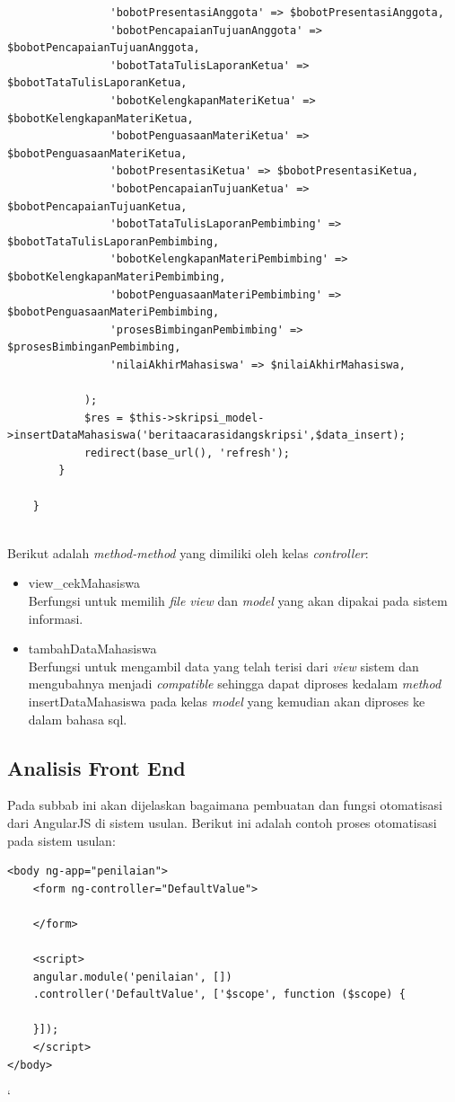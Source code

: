 \begin{lstlisting}
				'bobotPresentasiAnggota' => $bobotPresentasiAnggota,
				'bobotPencapaianTujuanAnggota' => $bobotPencapaianTujuanAnggota,
				'bobotTataTulisLaporanKetua' => $bobotTataTulisLaporanKetua,
				'bobotKelengkapanMateriKetua' => $bobotKelengkapanMateriKetua,
				'bobotPenguasaanMateriKetua' => $bobotPenguasaanMateriKetua,
				'bobotPresentasiKetua' => $bobotPresentasiKetua,
				'bobotPencapaianTujuanKetua' => $bobotPencapaianTujuanKetua,
				'bobotTataTulisLaporanPembimbing' => $bobotTataTulisLaporanPembimbing,
				'bobotKelengkapanMateriPembimbing' => $bobotKelengkapanMateriPembimbing,
				'bobotPenguasaanMateriPembimbing' => $bobotPenguasaanMateriPembimbing,
				'prosesBimbinganPembimbing' => $prosesBimbinganPembimbing,
				'nilaiAkhirMahasiswa' => $nilaiAkhirMahasiswa,
			
			);
			$res = $this->skripsi_model->insertDataMahasiswa('beritaacarasidangskripsi',$data_insert);
			redirect(base_url(), 'refresh');
		}
	
	}
	
\end{lstlisting}

Berikut adalah \textit{method-method} yang dimiliki oleh kelas \textit{controller}:
\begin{itemize}
	\item view\_cekMahasiswa\\
	Berfungsi untuk memilih \textit{file view} dan \textit{model} yang akan dipakai pada sistem informasi.
	\item tambahDataMahasiswa\\
	Berfungsi untuk mengambil data yang telah terisi dari \textit{view} sistem dan mengubahnya menjadi \textit{compatible} sehingga dapat diproses kedalam \textit{method} insertDataMahasiswa pada kelas \textit{model} yang kemudian akan diproses ke dalam bahasa sql.
\end{itemize}
	
	\subsection{Analisis Front End}
	\label{sub: frontEnd}
	
	Pada subbab ini akan dijelaskan bagaimana pembuatan dan fungsi otomatisasi dari AngularJS di sistem usulan. Berikut ini adalah contoh proses otomatisasi pada sistem usulan:
	
\begin{lstlisting}
<body ng-app="penilaian">
	<form ng-controller="DefaultValue">
	
	</form>
	
	<script>
	angular.module('penilaian', [])
	.controller('DefaultValue', ['$scope', function ($scope) {
	
	}]);
	</script>
</body>
\end{lstlisting}
	`
	
